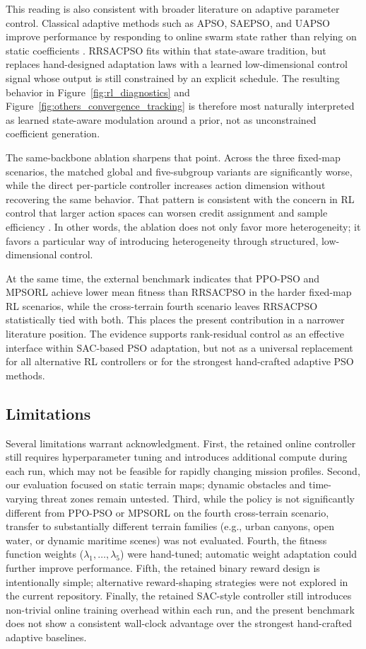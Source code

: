 \documentclass[final,5p,times]{elsarticle}
\begin{document}
This reading is also consistent with broader literature on adaptive parameter control.
Classical adaptive methods such as APSO, SAEPSO, and UAPSO improve performance by responding to online swarm state rather than relying on static coefficients \cite{Zhan2009Adaptive, Liu2025A, Isiet2019Selfadapting}.
RRSACPSO fits within that state-aware tradition, but replaces hand-designed adaptation laws with a learned low-dimensional control signal whose output is still constrained by an explicit schedule.
The resulting behavior in Figure~\ref{fig:rl_diagnostics} and Figure~\ref{fig:others_convergence_tracking} is therefore most naturally interpreted as learned state-aware modulation around a prior, not as unconstrained coefficient generation.

The same-backbone ablation sharpens that point.
Across the three fixed-map scenarios, the matched global and five-subgroup variants are significantly worse, while the direct per-particle controller increases action dimension without recovering the same behavior.
That pattern is consistent with the concern in RL control that larger action spaces can worsen credit assignment and sample efficiency \cite{DulacArnold2015Deep, Zhou2020PLAS}.
In other words, the ablation does not only favor more heterogeneity; it favors a particular way of introducing heterogeneity through structured, low-dimensional control.

At the same time, the external benchmark indicates that PPO-PSO and MPSORL achieve lower mean fitness than RRSACPSO in the harder fixed-map RL scenarios, while the cross-terrain fourth scenario leaves RRSACPSO statistically tied with both.
This places the present contribution in a narrower literature position.
The evidence supports rank-residual control as an effective interface within SAC-based PSO adaptation, but not as a universal replacement for all alternative RL controllers or for the strongest hand-crafted adaptive PSO methods.
\subsection{Limitations}
Several limitations warrant acknowledgment.
First, the retained online controller still requires hyperparameter tuning and introduces additional compute during each run, which may not be feasible for rapidly changing mission profiles.
Second, our evaluation focused on static terrain maps; dynamic obstacles and time-varying threat zones remain untested.
Third, while the policy is not significantly different from PPO-PSO or MPSORL on the fourth cross-terrain scenario, transfer to substantially different terrain families (e.g., urban canyons, open water, or dynamic maritime scenes) was not evaluated.
Fourth, the fitness function weights ($\lambda_1, \ldots, \lambda_5$) were hand-tuned; automatic weight adaptation could further improve performance.
Fifth, the retained binary reward design is intentionally simple; alternative reward-shaping strategies were not explored in the current repository.
Finally, the retained SAC-style controller still introduces non-trivial online training overhead within each run, and the present benchmark does not show a consistent wall-clock advantage over the strongest hand-crafted adaptive baselines.
\end{document}
